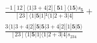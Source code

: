 \documentclass[varwidth, border=5pt]{standalone}
\begin{document}
\begin{my}
$\begin{gathered}
\scriptscriptstyle\frac{-1[12]⟨1|3+4|2][𝟓1]⟨1𝟓⟩s_{𝟓}}{[23]⟨1|𝟓|1]²⟨1|2+3|4]} +\\
\scriptscriptstyle\frac{3⟨1|3+4|2][𝟓|𝟓|3+4|2][1|𝟓|𝟓⟩}{[23]⟨1|𝟓|1]⟨1|2+3|4]s_{234}} \phantom{+}
\end{gathered}$
\end{my}
\end{document}
